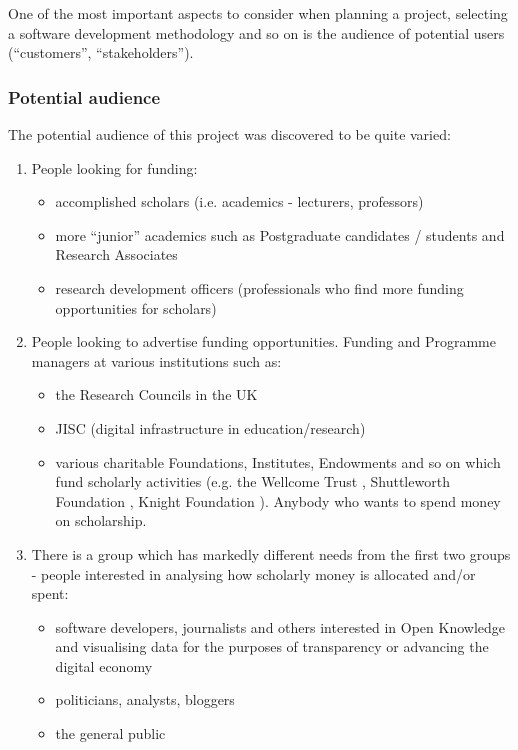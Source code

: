 \documentclass[11pt,fleqn,twoside]{article}
\begin{document}
One of the most important aspects to consider when planning a project, selecting a software development methodology and so on is the audience of potential users (``customers'', ``stakeholders'').

\subsubsection{Potential audience}
\label{audience}
The potential audience of this project was discovered to be quite varied:
\begin{enumerate}
	
	\item People looking for funding:
	\begin{itemize}
		\item accomplished scholars (i.e. academics - lecturers, professors)
		\item more ``junior'' academics such as Postgraduate candidates / students and Research Associates
		\item research development officers (professionals who find more funding opportunities for scholars)
	\end{itemize}
	
	\item People looking to advertise funding opportunities. Funding and Programme managers at various institutions such as:
	\begin{itemize}
		\item the Research Councils in the UK
		\item JISC (digital infrastructure in education/research) \cite{jisc}
		\item various charitable Foundations, Institutes, Endowments and so on which fund scholarly activities (e.g. the Wellcome Trust \cite{wellcome-trust}, Shuttleworth Foundation \cite{shuttleworth-foundation}, Knight Foundation \cite{knight-foundation}). Anybody who wants to spend money on scholarship.
	\end{itemize}
	
	\item There is a group which has markedly different needs from the first two groups - people interested in analysing how scholarly money is allocated and/or spent:
	\begin{itemize}
		\item software developers, journalists and others interested in Open Knowledge and visualising data for the purposes of transparency or advancing the digital economy \cite{okfn-vision}
		\item politicians, analysts, bloggers
		\item the general public
	\end{itemize}
\end{enumerate}
\end{document}

